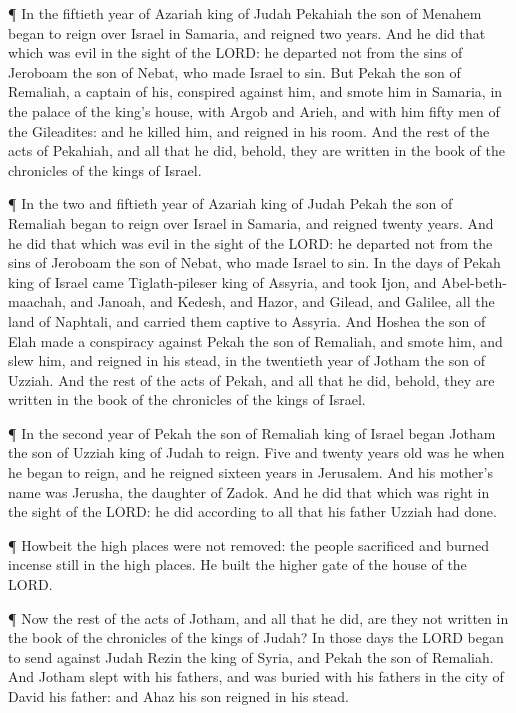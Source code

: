  ¶ In the fiftieth year of Azariah king of Judah Pekahiah
the son of Menahem began to reign over Israel in Samaria, and reigned
two years.  And he did that which was evil in the sight of
the LORD: he departed not from the sins of Jeroboam the son of Nebat,
who made Israel to sin.  But Pekah the son of Remaliah, a
captain of his, conspired against him, and smote him in Samaria, in the
palace of the king's house, with Argob and Arieh, and with him fifty men
of the Gileadites: and he killed him, and reigned in his room.
 And the rest of the acts of Pekahiah, and all that he did,
behold, they are written in the book of the chronicles of the kings of
Israel.

 ¶ In the two and fiftieth year of Azariah king of Judah
Pekah the son of Remaliah began to reign over Israel in Samaria, and
reigned twenty years.  And he did that which was evil in
the sight of the LORD: he departed not from the sins of Jeroboam the son
of Nebat, who made Israel to sin.  In the days of Pekah
king of Israel came Tiglath-pileser king of Assyria, and took Ijon, and
Abel-beth-maachah, and Janoah, and Kedesh, and Hazor, and Gilead, and
Galilee, all the land of Naphtali, and carried them captive to Assyria.
 And Hoshea the son of Elah made a conspiracy against Pekah
the son of Remaliah, and smote him, and slew him, and reigned in his
stead, in the twentieth year of Jotham the son of Uzziah. 
And the rest of the acts of Pekah, and all that he did, behold, they are
written in the book of the chronicles of the kings of Israel.

 ¶ In the second year of Pekah the son of Remaliah king of
Israel began Jotham the son of Uzziah king of Judah to reign.
 Five and twenty years old was he when he began to reign,
and he reigned sixteen years in Jerusalem. And his mother's name was
Jerusha, the daughter of Zadok.  And he did that which was
right in the sight of the LORD: he did according to all that his father
Uzziah had done.

 ¶ Howbeit the high places were not removed: the people
sacrificed and burned incense still in the high places. He built the
higher gate of the house of the LORD.

 ¶ Now the rest of the acts of Jotham, and all that he did,
are they not written in the book of the chronicles of the kings of
Judah?  In those days the LORD began to send against Judah
Rezin the king of Syria, and Pekah the son of Remaliah. 
And Jotham slept with his fathers, and was buried with his fathers in
the city of David his father: and Ahaz his son reigned in his stead.

